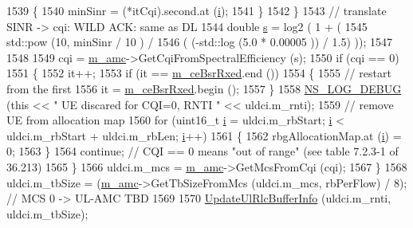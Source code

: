 \begin{DoxyCode}
1539                 \{
1540                   minSinr = (*itCqi).second.at (\hyperlink{bernuolliDistribution_8m_a6f6ccfcf58b31cb6412107d9d5281426}{i});
1541                 \}
1542             \}
1543           \textcolor{comment}{// translate SINR -> cqi: WILD ACK: same as DL}
1544           \textcolor{keywordtype}{double} \hyperlink{generate__test__data__lte__sinr_8m_ad83eeb3a142285d1243a08c6b7026df8}{s} = log2 ( 1 + (
1545                                  std::pow (10, minSinr / 10 )  /
1546                                  ( (-std::log (5.0 * 0.00005 )) / 1.5) ));
1547 
1548 
1549           cqi = \hyperlink{classns3_1_1RrFfMacScheduler_ad4ff8c2f667affc956f298199d8c8fa5}{m\_amc}->GetCqiFromSpectralEfficiency (s);
1550           \textcolor{keywordflow}{if} (cqi == 0)
1551             \{
1552               it++;
1553               \textcolor{keywordflow}{if} (it == \hyperlink{classns3_1_1RrFfMacScheduler_a1696bc07e1fdc0336106223f97b44298}{m\_ceBsrRxed}.end ())
1554                 \{
1555                   \textcolor{comment}{// restart from the first}
1556                   it = \hyperlink{classns3_1_1RrFfMacScheduler_a1696bc07e1fdc0336106223f97b44298}{m\_ceBsrRxed}.begin ();
1557                 \}
1558               \hyperlink{group__logging_ga413f1886406d49f59a6a0a89b77b4d0a}{NS\_LOG\_DEBUG} (\textcolor{keyword}{this} << \textcolor{stringliteral}{" UE discared for CQI=0, RNTI "} << uldci.m\_rnti);
1559               \textcolor{comment}{// remove UE from allocation map}
1560               \textcolor{keywordflow}{for} (uint16\_t \hyperlink{bernuolliDistribution_8m_a6f6ccfcf58b31cb6412107d9d5281426}{i} = uldci.m\_rbStart; \hyperlink{bernuolliDistribution_8m_a6f6ccfcf58b31cb6412107d9d5281426}{i} < uldci.m\_rbStart + uldci.m\_rbLen; 
      \hyperlink{bernuolliDistribution_8m_a6f6ccfcf58b31cb6412107d9d5281426}{i}++)
1561                 \{
1562                   rbgAllocationMap.at (\hyperlink{bernuolliDistribution_8m_a6f6ccfcf58b31cb6412107d9d5281426}{i}) = 0;
1563                 \}
1564               \textcolor{keywordflow}{continue}; \textcolor{comment}{// CQI == 0 means "out of range" (see table 7.2.3-1 of 36.213)}
1565             \}
1566           uldci.m\_mcs = \hyperlink{classns3_1_1RrFfMacScheduler_ad4ff8c2f667affc956f298199d8c8fa5}{m\_amc}->GetMcsFromCqi (cqi);
1567         \}
1568       uldci.m\_tbSize = (\hyperlink{classns3_1_1RrFfMacScheduler_ad4ff8c2f667affc956f298199d8c8fa5}{m\_amc}->GetTbSizeFromMcs (uldci.m\_mcs, rbPerFlow) / 8); \textcolor{comment}{// MCS 0 -> UL-AMC TBD}
1569 
1570       \hyperlink{classns3_1_1RrFfMacScheduler_afb35721c4c54c4114e5aeb4cf03ff175}{UpdateUlRlcBufferInfo} (uldci.m\_rnti, uldci.m\_tbSize);

\end{DoxyCode}
